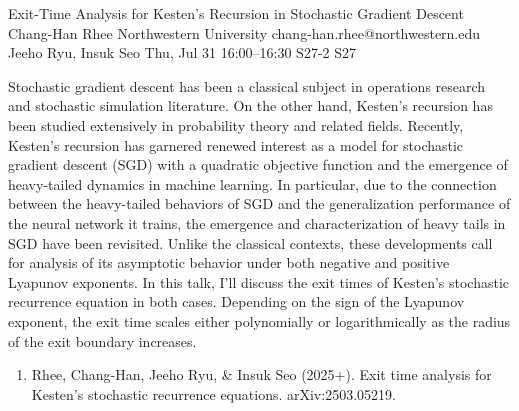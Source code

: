 \begin{talk}
  {Exit-Time Analysis for Kesten's Recursion in Stochastic Gradient Descent}%
  {Chang-Han Rhee}%
  {Northwestern University}%
  {chang-han.rhee@northwestern.edu}%
  {Jeeho Ryu, Insuk Seo}%
  {}%
  {Thu, Jul 31 16:00--16:30}%
  {S27-2}%
  {S27}%
  
    


Stochastic gradient descent has been a classical subject in operations research and stochastic simulation literature.
On the other hand, Kesten's recursion has been studied extensively in probability theory and related fields. 
Recently, Kesten's recursion has garnered renewed interest as a model for stochastic
gradient descent (SGD) with a quadratic objective function and the emergence of heavy-tailed dynamics in machine learning. 
In particular, due to the connection between the heavy-tailed behaviors of SGD and the generalization performance of the neural network it trains, the emergence and characterization of heavy tails in SGD have been revisited. 
Unlike the classical contexts, these developments call for analysis of its asymptotic behavior under both negative and positive Lyapunov exponents. In this talk, I'll discuss the exit times of Kesten's stochastic recurrence equation in both cases. Depending on the sign of the Lyapunov exponent, the exit time scales either polynomially or logarithmically as the radius of the exit boundary increases.

\medskip

\begin{enumerate}
 \item[{[1]}] 
    Rhee, Chang-Han, Jeeho Ryu, \& Insuk Seo (2025+). Exit time analysis for Kesten's stochastic recurrence equations. arXiv:2503.05219.
    

\end{enumerate}

\end{talk}

